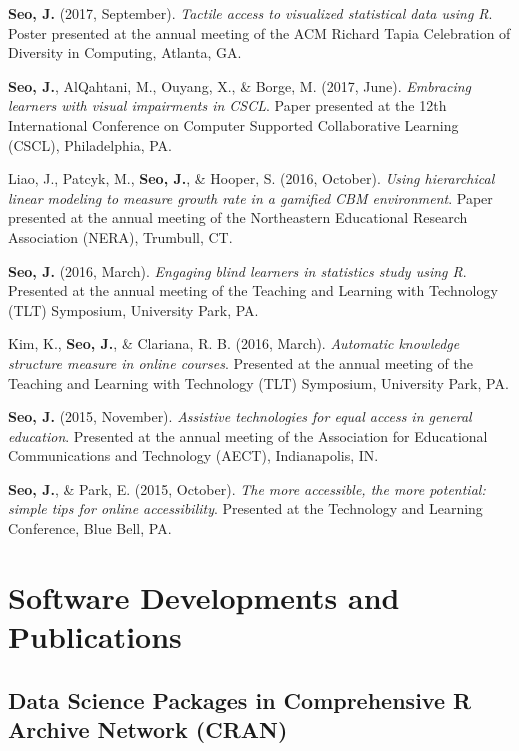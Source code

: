 \documentclass[11pt, a4paper]{awesome-cv}
\begin{document}
\textbf{Seo, J.} (2017, September). \emph{Tactile access to visualized statistical data using R}. Poster presented at the annual meeting of the ACM Richard Tapia Celebration of Diversity in Computing, Atlanta, GA.

\textbf{Seo, J.}, AlQahtani, M., Ouyang, X., \& Borge, M. (2017, June). \emph{Embracing learners with visual impairments in CSCL}. Paper presented at the 12th International Conference on Computer Supported Collaborative Learning (CSCL), Philadelphia, PA.

Liao, J., Patcyk, M., \textbf{Seo, J.}, \& Hooper, S. (2016, October). \emph{Using hierarchical linear modeling to measure growth rate in a gamified CBM environment}. Paper presented at the annual meeting of the Northeastern Educational Research Association (NERA), Trumbull, CT.

\textbf{Seo, J.} (2016, March). \emph{Engaging blind learners in statistics study using R}. Presented at the annual meeting of the Teaching and Learning with Technology (TLT) Symposium, University Park, PA.

Kim, K., \textbf{Seo, J.}, \& Clariana, R. B. (2016, March). \emph{Automatic knowledge structure measure in online courses}. Presented at the annual meeting of the Teaching and Learning with Technology (TLT) Symposium, University Park, PA.

\textbf{Seo, J.} (2015, November). \emph{Assistive technologies for equal access in general education}. Presented at the annual meeting of the Association for Educational Communications and Technology (AECT), Indianapolis, IN.

\textbf{Seo, J.}, \& Park, E. (2015, October). \emph{The more accessible, the more potential: simple tips for online accessibility}. Presented at the Technology and Learning Conference, Blue Bell, PA.

\endgroup

\hypertarget{software-developments-and-publications}{%
\section{Software Developments and Publications}\label{software-developments-and-publications}}

\hypertarget{data-science-packages-in-comprehensive-r-archive-network-cran}{%
\subsection{Data Science Packages in Comprehensive R Archive Network (CRAN)}\label{data-science-packages-in-comprehensive-r-archive-network-cran}}
\end{document}
